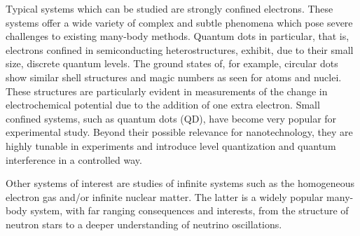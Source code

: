 \documentclass[%
oneside,                 %
final,                   %
10pt]{article}
\begin{document}
Typical systems which can be studied are strongly confined
electrons. These systems offer a wide variety of complex and subtle
phenomena which pose severe challenges to existing many-body methods.
Quantum dots in particular, that is, electrons confined in
semiconducting heterostructures, exhibit, due to their small size,
discrete quantum levels.  The ground states of, for example, circular
dots show similar shell structures and magic numbers as seen for atoms
and nuclei. These structures are particularly evident in measurements
of the change in electrochemical potential due to the addition of one
extra electron.  Small confined systems, such as quantum dots (QD),
have become very popular for experimental study.  Beyond their
possible relevance for nanotechnology, they are highly tunable in
experiments and introduce level quantization and quantum interference
in a controlled way.

Other systems of interest are studies of infinite systems such as the
homogeneous electron gas and/or infinite nuclear matter.  The latter
is a widely popular many-body system, with far ranging consequences
and interests, from the structure of neutron stars to a deeper
understanding of neutrino oscillations.
\end{document}
